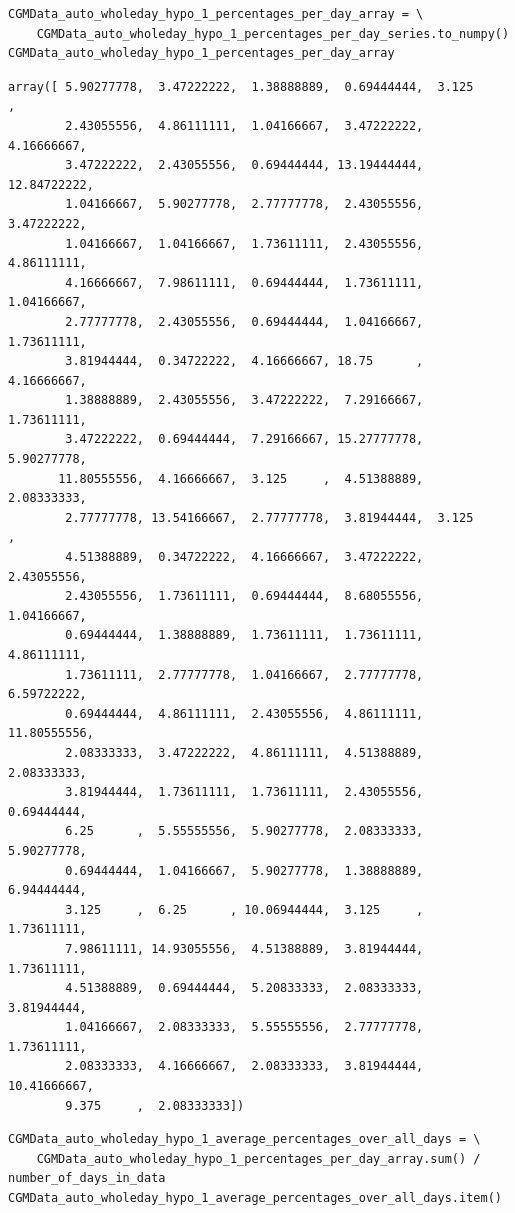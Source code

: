 \begin{verbatim}
CGMData_auto_wholeday_hypo_1_percentages_per_day_array = \
    CGMData_auto_wholeday_hypo_1_percentages_per_day_series.to_numpy()
CGMData_auto_wholeday_hypo_1_percentages_per_day_array
\end{verbatim}

\begin{verbatim}
array([ 5.90277778,  3.47222222,  1.38888889,  0.69444444,  3.125     ,
        2.43055556,  4.86111111,  1.04166667,  3.47222222,  4.16666667,
        3.47222222,  2.43055556,  0.69444444, 13.19444444, 12.84722222,
        1.04166667,  5.90277778,  2.77777778,  2.43055556,  3.47222222,
        1.04166667,  1.04166667,  1.73611111,  2.43055556,  4.86111111,
        4.16666667,  7.98611111,  0.69444444,  1.73611111,  1.04166667,
        2.77777778,  2.43055556,  0.69444444,  1.04166667,  1.73611111,
        3.81944444,  0.34722222,  4.16666667, 18.75      ,  4.16666667,
        1.38888889,  2.43055556,  3.47222222,  7.29166667,  1.73611111,
        3.47222222,  0.69444444,  7.29166667, 15.27777778,  5.90277778,
       11.80555556,  4.16666667,  3.125     ,  4.51388889,  2.08333333,
        2.77777778, 13.54166667,  2.77777778,  3.81944444,  3.125     ,
        4.51388889,  0.34722222,  4.16666667,  3.47222222,  2.43055556,
        2.43055556,  1.73611111,  0.69444444,  8.68055556,  1.04166667,
        0.69444444,  1.38888889,  1.73611111,  1.73611111,  4.86111111,
        1.73611111,  2.77777778,  1.04166667,  2.77777778,  6.59722222,
        0.69444444,  4.86111111,  2.43055556,  4.86111111, 11.80555556,
        2.08333333,  3.47222222,  4.86111111,  4.51388889,  2.08333333,
        3.81944444,  1.73611111,  1.73611111,  2.43055556,  0.69444444,
        6.25      ,  5.55555556,  5.90277778,  2.08333333,  5.90277778,
        0.69444444,  1.04166667,  5.90277778,  1.38888889,  6.94444444,
        3.125     ,  6.25      , 10.06944444,  3.125     ,  1.73611111,
        7.98611111, 14.93055556,  4.51388889,  3.81944444,  1.73611111,
        4.51388889,  0.69444444,  5.20833333,  2.08333333,  3.81944444,
        1.04166667,  2.08333333,  5.55555556,  2.77777778,  1.73611111,
        2.08333333,  4.16666667,  2.08333333,  3.81944444, 10.41666667,
        9.375     ,  2.08333333])
\end{verbatim}

\begin{verbatim}
CGMData_auto_wholeday_hypo_1_average_percentages_over_all_days = \
    CGMData_auto_wholeday_hypo_1_percentages_per_day_array.sum() / number_of_days_in_data
CGMData_auto_wholeday_hypo_1_average_percentages_over_all_days.item()
\end{verbatim}

